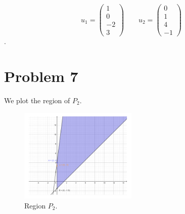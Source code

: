\documentclass[12pt]{article}
\begin{document}
\begin{enumerate}
\begin{itemize}
$$
u_1 = \begin{pmatrix}
1 \\
0 \\
-2 \\
3
\end{pmatrix} \qquad
u_2 = \begin{pmatrix}
0 \\
1 \\
4 \\
-1
\end{pmatrix}
$$.

\end{itemize}

\end{enumerate}

\section*{Problem 7}

We plot the region of $P_2$.

\begin{figure}[htbp]
  \caption{Region $P_2$.}
  \centering
    \includegraphics[width=0.5\textwidth]{p7.pdf}
\end{figure}

\FloatBarrier
\end{document}
